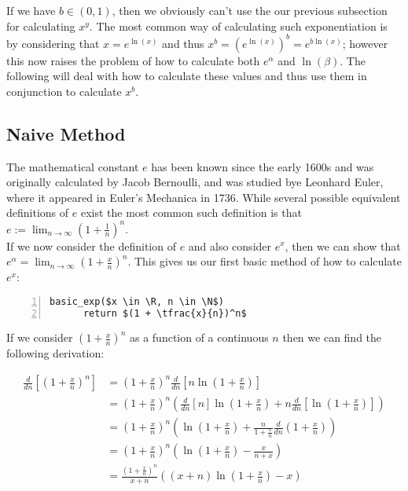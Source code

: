If we have \(b \in (0, 1)\), then we obviously can't use the our previous subsection for calculating \(x^y\). The most common way of calculating such exponentiation is by considering that \(x = e^{\ln(x)}\) and thus \(x^b = (e^{\ln(x)})^b = e^{b\ln(x)}\); however this now raises the problem of how to calculate both \(e^\alpha\) and \(\ln(\beta)\). The following will deal with how to calculate these values and thus use them in conjunction to calculate \(x^b\).\\

\subsection{Naive Method}

The mathematical constant \(e\) has been known since the early 1600s and was originally calculated by Jacob Bernoulli, and was studied bye Leonhard Euler, where it appeared in Euler's Mechanica in 1736. While several possible equivalent definitions of \(e\) exist the most common such definition is that \(e := \lim_{n \to \infty}(1 + \tfrac{1}{n})^n\).\\

If we now consider the definition of \(e\) and also consider \(e^x\), then we can show that \(e^\alpha = \lim_{n\to\infty}(1+\tfrac{x}{n})^n\). This gives us our first basic method of how to calculate \(e^x\):

\begin{lstlisting}[numbers=left,frame=single,mathescape,caption={Baisc Method for calculating \(e^\alpha\)},label={PCD_"basic exp"}]
  basic_exp($x \in \R, n \in \N$)
      return $(1 + \tfrac{x}{n})^n$
\end{lstlisting}

If we consider \((1+\tfrac{x}{n})^n\) as a function of a continuous \(n\) then we can find the following derivation:

\begin{align*}
	\frac{d}{dn}\left[(1 + \frac{x}{n})^n\right]
		&= (1+\frac{x}{n})^n\frac{d}{dn}\left[n\ln(1+\frac{x}{n})\right]\\
	&= (1+\frac{x}{n})^n(\frac{d}{dn}[n]\ln(1+\frac{x}{n}) 
		+ n\frac{d}{dn}\left[\ln(1+\frac{x}{n})\right])\\
	&=(1+\frac{x}{n})^n(\ln(1+\frac{x}{n}) 
		+ \frac{n}{1 + \frac{x}{n}}\frac{d}{dn}(1 + \frac{x}{n}))\\
	&=(1+\frac{x}{n})^n(\ln(1+\frac{x}{n}) - \frac{x}{n + x})\\
	&=\frac{(1+\frac{x}{n})^n}{x + n}((x + n)\ln(1 + \frac{x}{n}) - x)
\end{align*}

